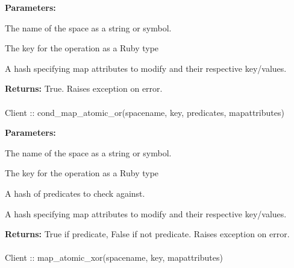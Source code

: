 \noindent\textbf{Parameters:}
\begin{description}[labelindent=\widthof{{\code{mapattributes}}},leftmargin=*,noitemsep,nolistsep,align=right]
\item[\code{spacename}] The name of the space as a string or symbol.
\item[\code{key}] The key for the operation as a Ruby type
\item[\code{mapattributes}] A hash specifying map attributes to modify and their respective key/values.
\end{description}

\noindent\textbf{Returns:}
True.  Raises exception on error.

\paragraph{}
\label{api:ruby:cond_map_atomic_or}
\begin{ccode}
Client :: cond_map_atomic_or(spacename, key, predicates, mapattributes)
\end{ccode}
\funcdesc 

\noindent\textbf{Parameters:}
\begin{description}[labelindent=\widthof{{\code{mapattributes}}},leftmargin=*,noitemsep,nolistsep,align=right]
\item[\code{spacename}] The name of the space as a string or symbol.
\item[\code{key}] The key for the operation as a Ruby type
\item[\code{predicates}] A hash of predicates to check against.
\item[\code{mapattributes}] A hash specifying map attributes to modify and their respective key/values.
\end{description}

\noindent\textbf{Returns:}
True if predicate, False if not predicate.  Raises exception on error.

\paragraph{}
\label{api:ruby:map_atomic_xor}
\begin{ccode}
Client :: map_atomic_xor(spacename, key, mapattributes)
\end{ccode}
\funcdesc 

